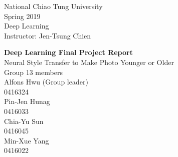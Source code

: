


\begin{titlepage} %

	
\begin{minipage}{0.4\textwidth} %
    \begin{flushleft} %
    \large
    National Chiao Tung University\\ %
    Spring 2019 \\ %
    Deep Learning \\ %
    Instructor: Jen-Tsung Chien\\ %
    \end{flushleft}
\end{minipage}
	
\vspace*{2in} %
	
\center %

	
{\huge\bfseries Deep Learning Final Project Report}\\[0.4cm] %
{\Large Neural Style Transfer to Make Photo Younger or Older}
\\{\large Group 13 members}
\\
Alfons Hwu (Group leader) \\ %
0416324\\
Pin-Jen Hunag \\ %
0416033\\
Chia-Yu Sun \\ %
0416045\\
Min-Xue Yang\\ %
0416022\\
\vfill %


\end{titlepage}
